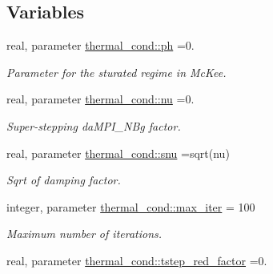 \subsection*{Variables}
\begin{DoxyCompactItemize}
\item 
\hypertarget{namespacethermal__cond_a37c3e000231baaaa4668f7c05f021ce0}{}real, parameter \hyperlink{namespacethermal__cond_a37c3e000231baaaa4668f7c05f021ce0}{thermal\+\_\+cond\+::ph} =0.\label{namespacethermal__cond_a37c3e000231baaaa4668f7c05f021ce0}

\begin{DoxyCompactList}\small\item\em Parameter for the sturated regime in Mc\+Kee. \end{DoxyCompactList}\item 
\hypertarget{namespacethermal__cond_a38896e6bbd3b053ca066e407e4b3817f}{}real, parameter \hyperlink{namespacethermal__cond_a38896e6bbd3b053ca066e407e4b3817f}{thermal\+\_\+cond\+::nu} =0.\label{namespacethermal__cond_a38896e6bbd3b053ca066e407e4b3817f}

\begin{DoxyCompactList}\small\item\em Super-\/stepping da\+M\+P\+I\+\_\+\+N\+Bg factor. \end{DoxyCompactList}\item 
\hypertarget{namespacethermal__cond_a53b14d15ce11990f6453a335c81d1728}{}real, parameter \hyperlink{namespacethermal__cond_a53b14d15ce11990f6453a335c81d1728}{thermal\+\_\+cond\+::snu} =sqrt(nu)\label{namespacethermal__cond_a53b14d15ce11990f6453a335c81d1728}

\begin{DoxyCompactList}\small\item\em Sqrt of damping factor. \end{DoxyCompactList}\item 
\hypertarget{namespacethermal__cond_a5420f28be46174eb6852f14281ec7ace}{}integer, parameter \hyperlink{namespacethermal__cond_a5420f28be46174eb6852f14281ec7ace}{thermal\+\_\+cond\+::max\+\_\+iter} = 100\label{namespacethermal__cond_a5420f28be46174eb6852f14281ec7ace}

\begin{DoxyCompactList}\small\item\em Maximum number of iterations. \end{DoxyCompactList}\item 
\hypertarget{namespacethermal__cond_ae13a8d994e65b9e57ebb80e892c72aac}{}real, parameter \hyperlink{namespacethermal__cond_ae13a8d994e65b9e57ebb80e892c72aac}{thermal\+\_\+cond\+::tstep\+\_\+red\+\_\+factor} =0.\label{namespacethermal__cond_ae13a8d994e65b9e57ebb80e892c72aac}


\end{DoxyCompactItemize}
